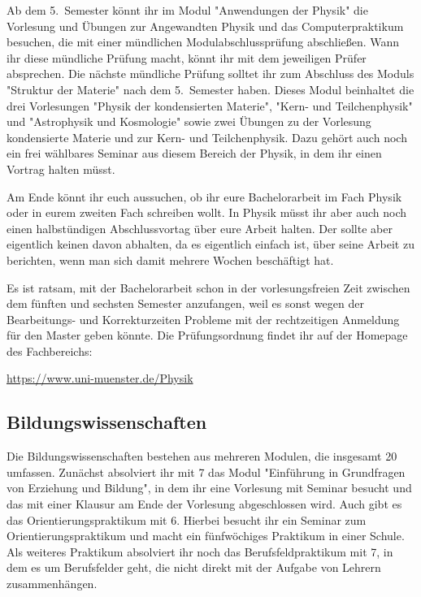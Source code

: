 \begin{multicols*}{2}
Ab dem 5.~Semester könnt ihr im Modul "Anwendungen der Physik" die Vorlesung und Übungen zur Angewandten Physik und das Computerpraktikum besuchen, die mit einer mündlichen Modulabschlussprüfung abschließen.
Wann ihr diese mündliche Prüfung macht, könnt ihr mit dem jeweiligen Prüfer absprechen.
Die nächste mündliche Prüfung solltet ihr zum Abschluss des Moduls "Struktur der Materie" nach dem 5.~Semester haben.
Dieses Modul beinhaltet die drei Vorlesungen "Physik der kondensierten Materie", "Kern- und Teilchenphysik" und "Astrophysik und Kosmologie" sowie zwei Übungen zu der Vorlesung kondensierte Materie und zur Kern- und Teilchenphysik.
Dazu gehört auch noch ein frei wählbares Seminar aus diesem Bereich der Physik, in dem ihr einen Vortrag halten müsst.

Am Ende könnt ihr euch aussuchen, ob ihr eure Bachelorarbeit im Fach Physik oder in eurem zweiten Fach schreiben wollt.
In Physik müsst ihr aber auch noch einen halbstündigen Abschlussvortag über eure Arbeit halten.
Der sollte aber eigentlich keinen davon abhalten, da es eigentlich einfach ist, über seine Arbeit zu berichten, wenn man sich damit mehrere Wochen beschäftigt hat.

Es ist ratsam, mit der Bachelorarbeit schon in der vorlesungsfreien Zeit zwischen dem fünften und sechsten Semester anzufangen, weil es sonst wegen der Bearbeitungs- und Korrekturzeiten Probleme mit der rechtzeitigen Anmeldung für den Master geben könnte.
Die Prüfungsordnung findet ihr auf der \foreignlanguage{english}{Homepage} des Fachbereichs:
\begin{center}
	\url{https://www.uni-muenster.de/Physik}
\end{center}

\subsection{Bildungswissenschaften}
Die Bildungswissenschaften bestehen aus mehreren Modulen, die insgesamt \SI{20}{\LP} umfassen.
Zunächst absolviert ihr mit \SI{7}{\LP} das Modul "Einführung in Grundfragen von Erziehung und Bildung", in dem ihr eine Vorlesung mit Seminar besucht und das mit einer Klausur am Ende der Vorlesung abgeschlossen wird.
Auch gibt es das Orientierungspraktikum mit \SI{6}{\LP}.
Hierbei besucht ihr ein Seminar zum Orientierungspraktikum und macht ein fünfwöchiges Praktikum in einer Schule.
Als weiteres Praktikum absolviert ihr noch das Berufsfeldpraktikum mit \SI{7}{\LP}, in dem es um Berufsfelder geht, die nicht direkt mit der Aufgabe von Lehrern zusammenhängen.


\end{multicols*}
